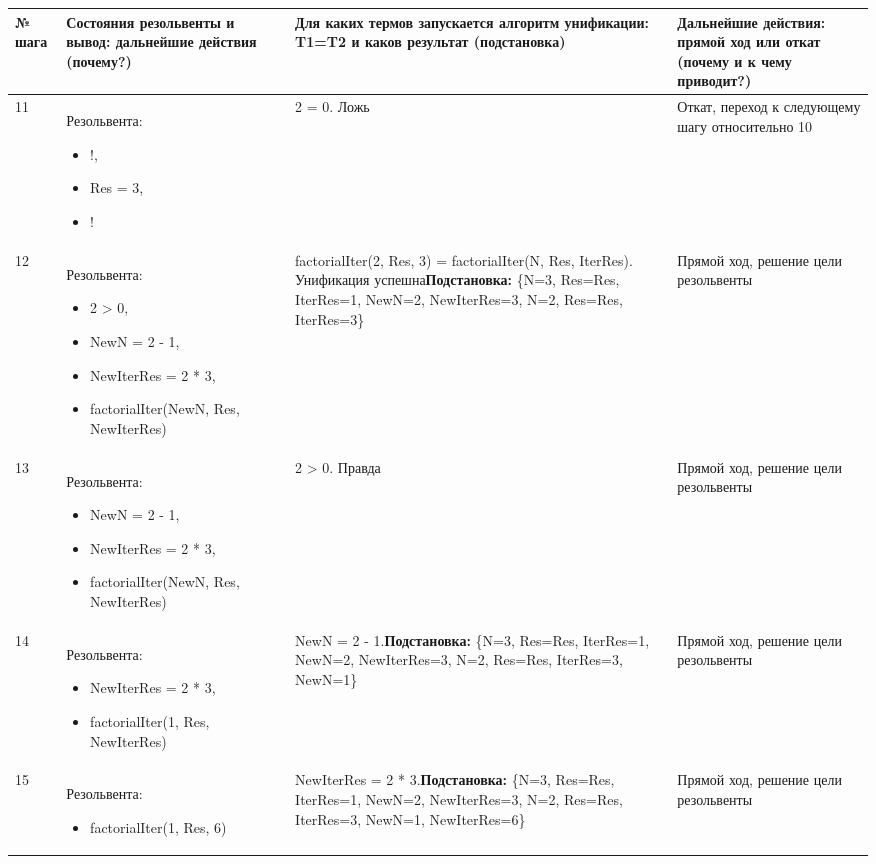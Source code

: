 \documentclass[14pt,a4paper]{scrreprt}
\begin{document}
\begin{table}[H]
	\begin{tabular}{|p{0.8cm\small}|p{4.7cm\small}|p{5.7cm\small}|p{4cm\small}|}	
		\hline
		№ шага & Состояния резольвенты и вывод: дальнейшие действия (почему?) & Для каких термов запускается алгоритм унификации: T1=T2 и каков результат (подстановка) & Дальнейшие действия: прямой ход или откат (почему и к чему приводит?)\\
		\hline
		11 & Резольвента:\begin{itemize}\item !, \item Res = 3, \item ! \end{itemize} & 2 = 0. Ложь & Откат, переход к следующему шагу относительно 10\\
		\hline
		12 & Резольвента:\begin{itemize} \item 2 > 0, \item NewN = 2 - 1, 
		\item NewIterRes = 2 * 3,
\item factorialIter(NewN, Res, NewIterRes)\end{itemize} & factorialIter(2, Res, 3) = factorialIter(N, Res, IterRes). Унификация успешна\linebreak \textbf{Подстановка:} \{N=3, Res=Res, IterRes=1, NewN=2, NewIterRes=3, N=2, Res=Res, IterRes=3\} & Прямой ход, решение цели резольвенты\\
		\hline
		13 & Резольвента:\begin{itemize} \item NewN = 2 - 1, 
			\item NewIterRes = 2 * 3,
\item factorialIter(NewN, Res, NewIterRes)\end{itemize} & 2 > 0. Правда & Прямой ход, решение цели резольвенты\\
		\hline
		14 & Резольвента:\begin{itemize} \item NewIterRes = 2 * 3,
\item factorialIter(1, Res, NewIterRes)\end{itemize} & NewN = 2 - 1.\linebreak \textbf{Подстановка:} \{N=3, Res=Res, IterRes=1, NewN=2, NewIterRes=3, N=2, Res=Res, IterRes=3, NewN=1\} & Прямой ход, решение цели резольвенты\\
		\hline
		15 & Резольвента:\begin{itemize} \item factorialIter(1, Res, 6)\end{itemize} & NewIterRes = 2 * 3.\linebreak \textbf{Подстановка:} \{N=3, Res=Res, IterRes=1, NewN=2, NewIterRes=3, N=2, Res=Res, IterRes=3, NewN=1, NewIterRes=6\} & Прямой ход, решение цели резольвенты\\
		\hline
	\end{tabular}
\end{table}
\end{document}
